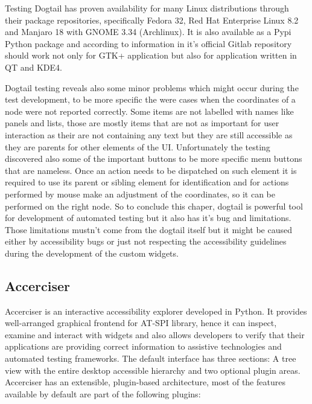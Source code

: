  Testing Dogtail has proven availability for many Linux distributions through their package repositories, specifically Fedora 32, Red Hat Enterprise Linux 8.2 and Manjaro 18 with GNOME 3.34 (Archlinux). It is also available as a Pypi Python package and according to information in it's official Gitlab repository should work not only for GTK+ application but also for application written in QT and KDE4. 
 
 Dogtail testing reveals also some minor problems which might occur during the test development, to be more specific the were cases when the coordinates of a node were not reported correctly. Some items are not labelled with names like panels and lists, those are mostly items that are not as important for user interaction as their are not containing any text but they are still accessible as they are parents for other elements of the UI. Unfortunately the testing discovered also some of the important buttons to be more specific menu buttons that are nameless. Once an action needs to be dispatched on such element it is required to use its parent or sibling element for identification and for actions performed by mouse make an adjustment of the coordinates, so it can be performed on the right node. So to conclude this chaper, dogtail is powerful tool for development of automated testing but it also has it's bug and limitations. Those limitations mustn't come from the dogtail itself but it might be caused either by accessibility bugs or just not respecting the accessibility guidelines during the development of the custom widgets. 

\subsection{Accerciser}
Accerciser is an interactive accessibility explorer developed in Python. It provides well-arranged graphical frontend for AT-SPI library, hence it can inspect, examine and interact with widgets and also allows developers to verify that their applications are providing correct information to assistive technologies and automated testing frameworks. The default interface has three sections: A tree view with the entire desktop accessible hierarchy and two optional plugin areas. Accerciser has an extensible, plugin-based architecture, most of the features available by default are part of the following plugins\cite{accerciser}: 

